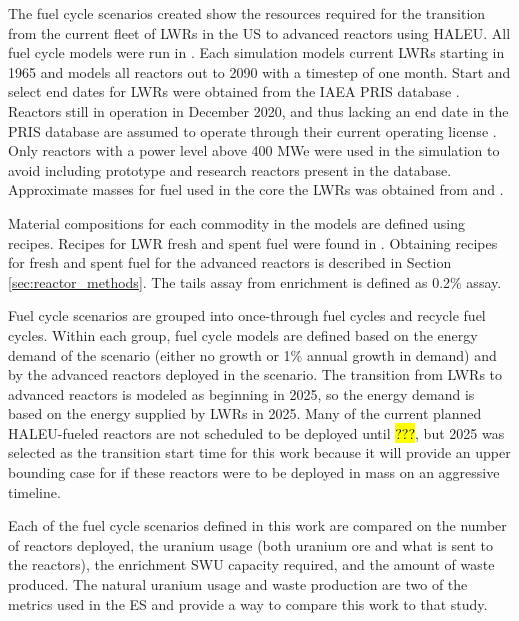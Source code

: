 The fuel cycle scenarios created show the resources required for the transition from the 
current fleet of \glspl{LWR} in the US to advanced reactors using \gls{HALEU}.
All fuel cycle models were run in \Cyclus 
\cite{huff_fundamental_2016}. Each simulation models current 
\glspl{LWR} starting in 1965 and models all reactors out to 2090 with a timestep 
of one month. Start 
and select end dates for \glspl{LWR} were obtained from the \gls{IAEA} \gls{PRIS} database 
\cite{noauthor_power_1989}. Reactors still in operation in December 2020, and thus 
lacking an end date in the \gls{PRIS} database are assumed to operate through their 
current operating license 
\cite{noauthor_us_nodate}.
Only reactors with a power level above 400 MWe were used in the simulation 
to avoid including prototype and research reactors present in the database. 
Approximate masses for fuel used in the core the \glspl{LWR} was obtained 
from \cite{todreas_nuclear_2012} and \cite{cacuci_handbook_2010}. 

Material compositions for each commodity in the models are defined using recipes.
Recipes for \gls{LWR} fresh and spent fuel were found in \cite{jacobson_verifiable_2010}.
Obtaining recipes for fresh and spent fuel for the advanced reactors is described in 
Section \ref{sec:reactor_methods}. The tails assay from enrichment is defined as 
0.2\% assay. 

Fuel cycle scenarios are grouped into once-through fuel cycles and recycle fuel 
cycles. Within each group, fuel cycle models are defined based on the energy demand 
of the scenario (either no growth or 1\% annual growth in demand) and by the 
advanced reactors deployed in the scenario. The transition from \glspl{LWR} to 
advanced reactors is modeled as beginning in 2025, so the energy demand is based on the 
energy supplied by \glspl{LWR} in 2025. Many of the current planned \gls{HALEU}-fueled 
reactors are not scheduled to be deployed until \hl{???}, but 2025 was selected as 
the transition start time for this work because it will provide an upper 
bounding case for if these reactors were to be deployed in mass on 
an aggressive timeline. 

Each of the fuel cycle scenarios 
defined in this work are compared on the number of reactors deployed, the 
uranium usage (both uranium ore and what is sent to the reactors), the enrichment 
\gls{SWU} capacity required, and the amount of waste produced. The natural 
uranium usage and waste production are two of the metrics used in the \gls{ES} 
\cite{wigeland_nuclear_2014} and provide a way to compare this work to that study.

